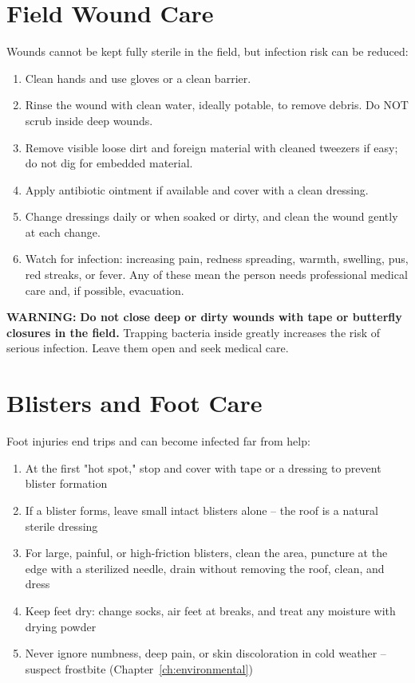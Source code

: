 \section{Field Wound Care}

Wounds cannot be kept fully sterile in the field, but infection risk can be reduced:

\begin{enumerate}[leftmargin=*]
\item Clean hands and use gloves or a clean barrier.
\item Rinse the wound with clean water, ideally potable, to remove debris. Do NOT scrub inside deep wounds.
\item Remove visible loose dirt and foreign material with cleaned tweezers if easy; do not dig for embedded material.
\item Apply antibiotic ointment if available and cover with a clean dressing.
\item Change dressings daily or when soaked or dirty, and clean the wound gently at each change.
\item Watch for infection: increasing pain, redness spreading, warmth, swelling, pus, red streaks, or fever. Any of these mean the person needs professional medical care and, if possible, evacuation.
\end{enumerate}

\textbf{WARNING:} \textbf{Do not close deep or dirty wounds with tape or butterfly closures in the field.} Trapping bacteria inside greatly increases the risk of serious infection. Leave them open and seek medical care.

\section{Blisters and Foot Care}

Foot injuries end trips and can become infected far from help:

\begin{enumerate}[leftmargin=*]
\item At the first "hot spot," stop and cover with tape or a dressing to prevent blister formation
\item If a blister forms, leave small intact blisters alone -- the roof is a natural sterile dressing
\item For large, painful, or high-friction blisters, clean the area, puncture at the edge with a sterilized needle, drain without removing the roof, clean, and dress
\item Keep feet dry: change socks, air feet at breaks, and treat any moisture with drying powder
\item Never ignore numbness, deep pain, or skin discoloration in cold weather -- suspect frostbite (Chapter~\ref{ch:environmental})
\end{enumerate}

